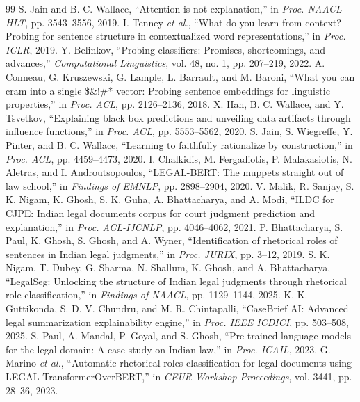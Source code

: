 \documentclass[conference]{IEEEtran}
\begin{document}
\begin{thebibliography}{99}
 S. Jain and B. C. Wallace, ``Attention is not explanation,'' in \textit{Proc. NAACL-HLT}, pp. 3543--3556, 2019.
 I. Tenney \textit{et al.}, ``What do you learn from context? Probing for sentence structure in contextualized word representations,'' in \textit{Proc. ICLR}, 2019.
 Y. Belinkov, ``Probing classifiers: Promises, shortcomings, and advances,'' \textit{Computational Linguistics}, vol. 48, no. 1, pp. 207--219, 2022.
 A. Conneau, G. Kruszewski, G. Lample, L. Barrault, and M. Baroni, ``What you can cram into a single \$\&!\#* vector: Probing sentence embeddings for linguistic properties,'' in \textit{Proc. ACL}, pp. 2126--2136, 2018.
 X. Han, B. C. Wallace, and Y. Tsvetkov, ``Explaining black box predictions and unveiling data artifacts through influence functions,'' in \textit{Proc. ACL}, pp. 5553--5562, 2020.
 S. Jain, S. Wiegreffe, Y. Pinter, and B. C. Wallace, ``Learning to faithfully rationalize by construction,'' in \textit{Proc. ACL}, pp. 4459--4473, 2020.
 I. Chalkidis, M. Fergadiotis, P. Malakasiotis, N. Aletras, and I. Androutsopoulos, ``LEGAL-BERT: The muppets straight out of law school,'' in \textit{Findings of EMNLP}, pp. 2898--2904, 2020.
 V. Malik, R. Sanjay, S. K. Nigam, K. Ghosh, S. K. Guha, A. Bhattacharya, and A. Modi, ``ILDC for CJPE: Indian legal documents corpus for court judgment prediction and explanation,'' in \textit{Proc. ACL-IJCNLP}, pp. 4046--4062, 2021.
 P. Bhattacharya, S. Paul, K. Ghosh, S. Ghosh, and A. Wyner, ``Identification of rhetorical roles of sentences in Indian legal judgments,'' in \textit{Proc. JURIX}, pp. 3--12, 2019.
 S. K. Nigam, T. Dubey, G. Sharma, N. Shallum, K. Ghosh, and A. Bhattacharya, ``LegalSeg: Unlocking the structure of Indian legal judgments through rhetorical role classification,'' in \textit{Findings of NAACL}, pp. 1129--1144, 2025.
 K. K. Guttikonda, S. D. V. Chundru, and M. R. Chintapalli, ``CaseBrief AI: Advanced legal summarization explainability engine,'' in \textit{Proc. IEEE ICDICI}, pp. 503--508, 2025.
 S. Paul, A. Mandal, P. Goyal, and S. Ghosh, ``Pre-trained language models for the legal domain: A case study on Indian law,'' in \textit{Proc. ICAIL}, 2023.
 G. Marino \textit{et al.}, ``Automatic rhetorical roles classification for legal documents using LEGAL-TransformerOverBERT,'' in \textit{CEUR Workshop Proceedings}, vol. 3441, pp. 28--36, 2023.

\end{thebibliography}
\end{document}
